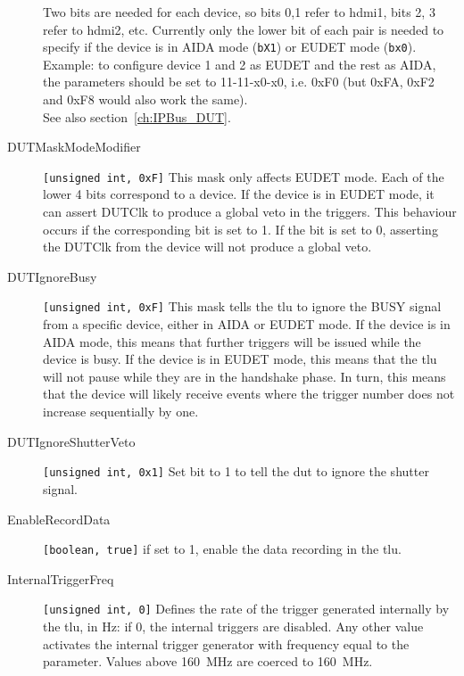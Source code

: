 \begin{description}
        Two bits are needed for each device, so bits 0,1 refer to \gls{hdmi}1, bits 2, 3 refer to \gls{hdmi}2, etc. Currently only the lower bit of each pair is needed to specify if the device is in AIDA mode (\texttt{bX1}) or EUDET mode (\texttt{bx0}).\\
        Example: to configure device 1 and 2 as EUDET and the rest as AIDA, the parameters should be set to 11-11-x0-x0, i.e. 0xF0 (but 0xFA, 0xF2 and 0xF8 would also work the same).\\
        See also section~\ref{ch:IPBus_DUT}.
  \item[DUTMaskModeModifier] \verb|[unsigned int, 0xF]| This mask only affects EUDET mode. Each of the lower 4 bits correspond to a device. If the device is in EUDET mode, it can assert DUTClk to produce a global veto in the triggers. This behaviour occurs if the corresponding bit is set to 1. If the bit is set to 0, asserting the DUTClk from the device will not produce a global veto.
  \item[DUTIgnoreBusy] \verb|[unsigned int, 0xF]| This mask tells the \gls{tlu} to ignore the BUSY signal from a specific device, either in AIDA or EUDET mode. If the device is in AIDA mode, this means that further triggers will be issued while the device is busy. If the device is in EUDET mode, this means that the \gls{tlu} will not pause while they are in the handshake phase. In turn, this means that the device will likely receive events where the trigger number does not increase sequentially by one.
  \item[DUTIgnoreShutterVeto] \verb|[unsigned int, 0x1]| Set bit to 1 to tell the \gls{dut} to ignore the shutter signal.
  \item[EnableRecordData] \verb|[boolean, true]| if set to 1, enable the data recording in the \gls{tlu}.
  \item[InternalTriggerFreq] \verb|[unsigned int, 0]| Defines the rate of the trigger generated internally by the \gls{tlu}, in Hz: if 0, the internal triggers are disabled. Any other value activates the internal trigger generator with frequency equal to the parameter. Values above 160~MHz are coerced to 160~MHz.
\end{description} 